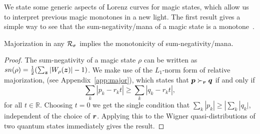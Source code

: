 \documentclass[pra,
aps,
twocolumn,
superscriptaddress,
groupedaddress,
nofootinbib,
reprint
]{revtex4-1}
\begin{document}
We state some generic aspects of Lorenz curves for magic states, which allow us to interpret previous magic monotones in a new light. The first result gives a simple way to see that the sum-negativity/mana of a magic state is a monotone~\cite{cit:veitch2}.

\begin{theorem} Majorization in any ${\mathcal R}_\sigma$ implies the monotonicity of sum-negativity/mana. 
\end{theorem}
\begin{proof}
	The sum-negativity of a magic state $\rho$ can be written as $sn(\rho) =\frac{1}{2} (\sum_{\bm{z}} |W_\rho(\bm{z}) | - 1)$.
We make use of the $L_1$-norm form of relative majorization, (see Appendix~\ref{app:major}), which states that $\boldsymbol{p} \succ_{\boldsymbol{r}} \boldsymbol{q}$ if and only if
	\begin{equation}
\sum_k | p_k - r_k t | \geq \sum_k | q_k - r_k t |,
\end{equation}
for all $t\in \mathbb{R}$. Choosing $t=0$ we get the single condition that $\sum_k |p_k| \ge |\sum_k |q_k|$, independent of the choice of $\boldsymbol{r}$. Applying this to the Wigner quasi-distributions of two quantum states immediately gives the result.
\end{proof}
\end{document}
